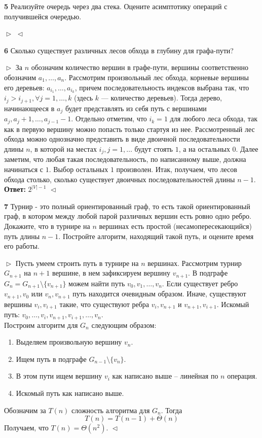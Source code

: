 \documentclass{article}
\begin{document}
\textbf{5} Реализуйте очередь через два стека. Оцените асимптотику операций с получившейся очередью.

$\vartriangleright$ $\vartriangleleft$
\medskip

\textbf{6} Сколько существует различных лесов обхода в глубину для графа-пути?

$\vartriangleright$
За $n$ обозначим количество вершин в графе-пути, вершины соответственно обозначим
$a_{1},\ldots,a_{n}$. Рассмотрим произвольный лес обхода, корневые вершины его деревьев: $a_{i_{1}},\ldots,a_{i_{k}}$,
причем последовательность индексов выбрана так, что $i_{j}>i_{j+1}, \forall j = 1,\ldots,k$ (здесь
$k$ --- количество деревьев). Тогда дерево,
начинающееся в $a_{j}$ будет представлять из себя путь с вершинами $a_{j}, a_{j}+1,\ldots,a_{j-1}-1$. Отдельно
отметим, что $i_{k} = 1$ для любого леса обхода, так как в первую вершину можно попасть только стартуя из нее.
Рассмотренный лес обхода можно однозначно представить в виде двоичной последовательности длины $n$, в которой
на местах $i_{j}, j = 1,\ldots$ будут стоять $1$, а на остальных $0$. Далее заметим, что любая такая
последовательность, по написанному выше, должна начинаться с $1$. Выбор остальных $1$ произволен.
Итак, получаем, что лесов обхода столько, сколько существует двоичных последовательностей длины
$n-1$. \\
\textbf{Ответ:} $2^{\left|V\right|-1}$
$\vartriangleleft$
\medskip

\textbf{7} Турнир - это полный ориентированный граф, то есть такой ориентированный граф, в котором между любой парой различных вершин есть ровно одно ребро. Докажите, что в турнире на $n$ вершинах есть простой (несамопересекающийся) путь длины $n - 1$. Постройте алгоритм, находящий такой путь, и оцените время его работы.

$\vartriangleright$
Пусть умеем строить путь в турнире на $n$ вершинах. Рассмотрим турнир $G_{n+1}$ на $n+1$ вершине, в нем зафиксируем вершину $v_{n+1}$. В подграфе $G_{n} = G_{n+1}\setminus\{v_{n+1}\}$ можем найти путь $v_{0}, v_{1},\ldots, v_{n}$. Если существует ребро
$v_{n+1},v_{0}$ или $v_{n}, v_{n+1}$ путь находится очевидным образом. Иначе, существуют вершины $v_{i}, v_{i+1}$ такие,
что существуют ребра $v_{i}, v_{n+1}$ и $v_{n+1},v_{i+1}$. Искомый путь: $v_{0},\ldots, v_{i}, v_{n+1}, v_{i+1},\ldots,v_{n}$.\\
Построим алгоритм для $G_{n}$ следующим образом:
\begin{enumerate}
  \item Выделяем произвольную вершину $v_{n}$.
  \item Ищем путь в подграфе $G_{n-1}\setminus\{v_{n}\}$.
  \item В этом пути ищем вершину $v_{i}$ как написано выше -- линейная по $n$ операция.
  \item Искомый путь как написано выше.
\end{enumerate}
Обозначим за $T(n)$ сложность алгоритма для $G_{n}$. Тогда
\[T(n) = T(n-1) + \Theta(n)\]
Получаем, что $T(n) = \Theta(n^{2})$.
$\vartriangleleft$
\medskip
\end{document}
